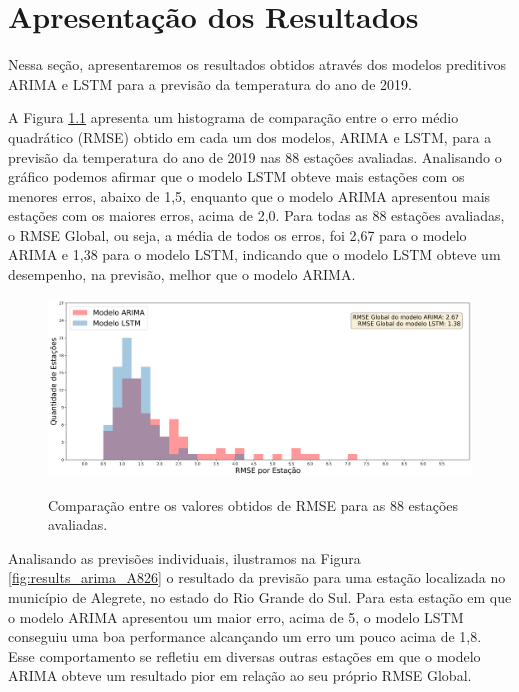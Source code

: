 \chapter{Apresentação dos Resultados}

Nessa seção, apresentaremos os resultados obtidos através dos modelos preditivos ARIMA e LSTM para a previsão da temperatura do ano de 2019. 

A Figura \ref{fig:results_histogram_arima_model_rmse} apresenta um histograma de comparação entre o erro médio quadrático (RMSE) obtido em cada um dos modelos, ARIMA e LSTM, para a previsão da temperatura do ano de 2019 nas 88 estações avaliadas. Analisando o gráfico podemos afirmar que o modelo LSTM obteve mais estações com os menores erros, abaixo de 1,5, enquanto que o modelo ARIMA apresentou mais estações com os maiores erros, acima de 2,0. Para todas as 88 estações avaliadas, o RMSE  Global, ou seja, a média de todos os erros, foi 2,67 para o modelo ARIMA e 1,38 para o modelo LSTM, indicando que o modelo LSTM obteve um desempenho, na previsão, melhor que o modelo ARIMA. 
 
 \begin{figure}[H]
    \centering
    \caption{Comparação entre os valores obtidos de RMSE para as 88 estações avaliadas.}
    \includegraphics[width=\textwidth]{figuras/results/comparacao_rmse_arima_lstm_histograma.png}
    \label{fig:results_histogram_arima_model_rmse}
\end{figure}

Analisando as previsões individuais, ilustramos na Figura \ref{fig:results_arima_A826} o resultado da previsão para uma estação localizada no município de Alegrete, no estado do Rio Grande do Sul. 
Para esta estação em que o modelo ARIMA apresentou um maior erro, acima de 5, o modelo LSTM conseguiu uma boa performance alcançando um erro um pouco acima de 1,8. Esse comportamento se refletiu em diversas outras estações em que o modelo ARIMA obteve um resultado pior em relação ao seu próprio RMSE Global.  


